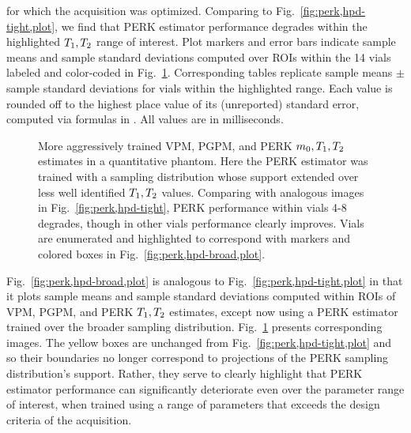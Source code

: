 \begin{figure*}[!t]
{		for which the acquisition was optimized.
		Comparing to Fig.~\ref{fig:perk,hpd-tight,plot},
		we find that PERK estimator performance degrades 
		within the highlighted $T_1,T_2$ range of interest.
		Plot markers and error bars
		indicate sample means and sample standard deviations
		computed over ROIs
		within the 14 vials
		labeled and color-coded
		in Fig.~\ref{fig:perk,hpd-broad}.
		Corresponding tables replicate 
		sample means $\pm$ sample standard deviations
		for vials within the highlighted range.
		Each value is rounded off
		to the highest place value 
		of its (unreported) standard error,
		computed via formulas in \cite{ahn:03:seo}.
		All values are in milliseconds.
	}
	\label{fig:perk,hpd-broad,plot}
\end{figure*}

\begin{figure}[!t]
	\centering
	\begin{minipage}{\textwidth}
  	\hspace{0cm}
  	\hspace{0cm}
	\end{minipage}
	\caption{%
		More aggressively trained 
		VPM, PGPM, and PERK $m_0,T_1,T_2$ estimates
		in a quantitative phantom.
		Here the PERK estimator was trained
		with a sampling distribution
		whose support extended
		over less well identified $T_1,T_2$ values.
		Comparing with analogous images 
		in Fig.~\ref{fig:perk,hpd-tight},
		PERK performance within vials 4-8 degrades,
		though in other vials 
		performance clearly improves. 
		Vials are enumerated and highlighted
		to correspond with markers and colored boxes
		in Fig.~\ref{fig:perk,hpd-broad,plot}.
	}
	\label{fig:perk,hpd-broad}
\end{figure}

Fig.~\ref{fig:perk,hpd-broad,plot} 
is analogous to Fig.~\ref{fig:perk,hpd-tight,plot}
in that it plots sample means and sample standard deviations
computed within ROIs 
of VPM, PGPM, and PERK $T_1,T_2$ estimates,
except now using a PERK estimator trained
over the broader sampling distribution.
Fig.~\ref{fig:perk,hpd-broad} presents corresponding images. 
The yellow boxes are unchanged
from Fig.~\ref{fig:perk,hpd-tight,plot}
and so their boundaries no longer correspond
to projections of the PERK sampling distribution's support.
Rather,
they serve to clearly highlight 
that PERK estimator performance
can significantly deteriorate
even over the parameter range of interest,
when trained using a range of parameters
that exceeds the design criteria
of the acquisition.


